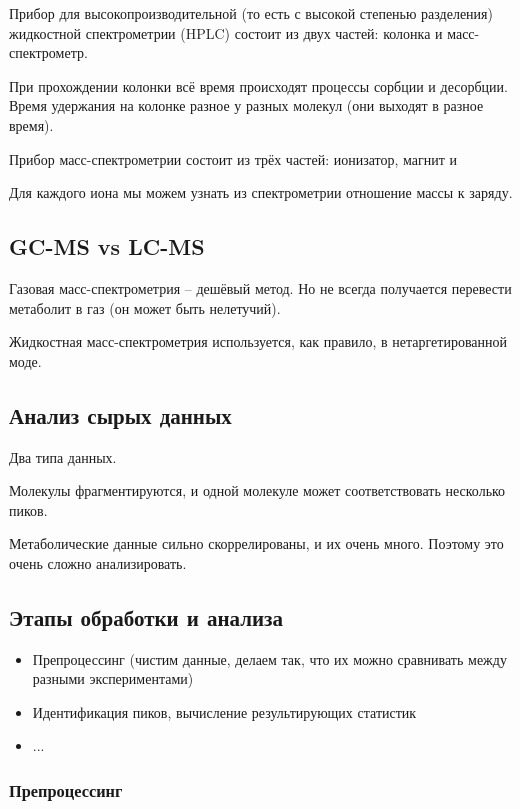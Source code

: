 \documentclass[main.tex]{subfiles}
\begin{document}
Прибор для высокопроизводительной (то есть с высокой степенью разделения) жидкостной спектрометрии (HPLC) состоит из двух частей: колонка и масс-спектрометр.

При прохождении колонки всё время происходят процессы сорбции и десорбции.
Время удержания на колонке разное у разных молекул (они выходят в разное время).

Прибор масс-спектрометрии состоит из трёх частей: ионизатор, магнит и 


Для каждого иона мы можем узнать из спектрометрии отношение массы к заряду.

\subsection{GC-MS vs LC-MS}

Газовая масс-спектрометрия -- дешёвый метод.
Но не всегда получается перевести метаболит в газ (он может быть нелетучий).

Жидкостная масс-спектрометрия используется, как правило, в нетаргетированной моде.

\subsection{Анализ сырых данных}

Два типа данных. %

Молекулы фрагментируются, и одной молекуле может соответствовать несколько пиков.

Метаболические данные сильно скоррелированы, и их очень много.
Поэтому это очень сложно анализировать.

\subsection{Этапы обработки и анализа}

\begin{itemize}[noitemsep]
	\item Препроцессинг (чистим данные, делаем так, что их можно сравнивать между разными экспериментами)
	\item Идентификация пиков, вычисление результирующих статистик
	\item ... %
\end{itemize}

\subsubsection{Препроцессинг}
\end{document}
